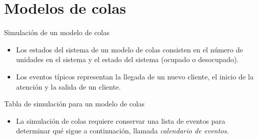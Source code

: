 \section{Modelos de colas}

\begin{frame}{Simulación de un modelo de colas}
    \begin{itemize}
        \item Los estados del sistema de un modelo de colas consisten en el número de unidades en el sistema y el estado del sistema (ocupado o desocupado).
        \item Los eventos típicos representan la llegada de un nuevo cliente, el inicio de la atención y la salida de un cliente.
    \end{itemize}
\end{frame}

\begin{frame}{Tabla de simulación para un modelo de colas}
    \begin{itemize}
        \item La simulación de colas requiere conservar una lista de eventos para determinar qué sigue a continuación, llamada \textit{calendario de eventos}.
    \end{itemize}
\end{frame}



